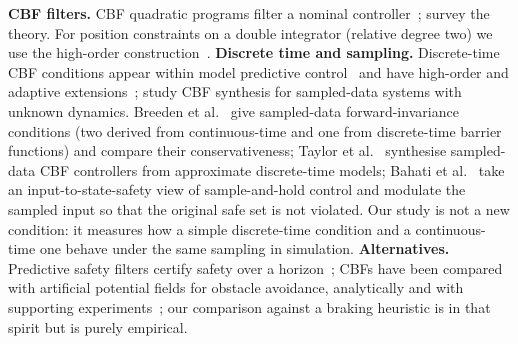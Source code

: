 \textbf{CBF filters.} CBF quadratic programs filter a nominal controller~\cite{ames2017control}; \cite{ames2019control} survey the theory. For position constraints on a double integrator (relative degree two) we use the high-order construction~\cite{xiao2019control}.
\textbf{Discrete time and sampling.} Discrete-time CBF conditions appear within model predictive control~\cite{zeng2021safety} and have high-order and adaptive extensions~\cite{xiong2023discrete}; \cite{niu2021safety} study CBF synthesis for sampled-data systems with unknown dynamics. Breeden et al.~\cite{breeden2021control} give sampled-data forward-invariance conditions (two derived from continuous-time and one from discrete-time barrier functions) and compare their conservativeness; Taylor et al.~\cite{taylor2022safety} synthesise sampled-data CBF controllers from approximate discrete-time models; Bahati et al.~\cite{bahati2023sample} take an input-to-state-safety view of sample-and-hold control and modulate the sampled input so that the original safe set is not violated. Our study is not a new condition: it measures how a simple discrete-time condition and a continuous-time one behave under the same sampling in simulation.
\textbf{Alternatives.} Predictive safety filters certify safety over a horizon~\cite{wabersich2021predictive}; CBFs have been compared with artificial potential fields for obstacle avoidance, analytically and with supporting experiments~\cite{singletary2021comparative}; our comparison against a braking heuristic is in that spirit but is purely empirical.

